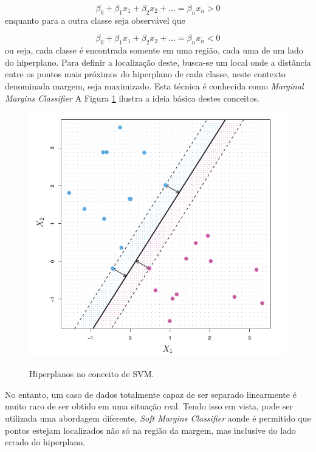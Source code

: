 \begin{equation}
\label{e.hyperplane-div1}
\beta_{0} + \beta_{1}x_{1} + \beta_{2}x_{2} + ... = \beta_{n}x_{n} > 0
\end{equation} enquanto para a outra classe seja observável que

\begin{equation}
\label{e.hyperplane-div2}
\beta_{0} + \beta_{1}x_{1} + \beta_{2}x_{2} + ... = \beta_{n}x_{n} < 0
\end{equation} ou seja, cada classe é encontrada somente em uma região, cada uma de um lado do hiperplano. Para definir a localização deste, busca-se um local onde a distância entre os pontos mais próximos do hiperplano de cada classe, neste contexto denominada margem, seja maximizado. Esta técnica é conhecida como \textit{Marginal Margins Classifier}
\cite{James:2014:ISL:2517747} A Figura \ref{f.hiperplano-svm} ilustra a ideia básica destes conceitos.

\begin{figure}[ht]
\caption{\small Hiperplanos no conceito de SVM.}
\centering
\includegraphics[scale=0.40]{figs/svm-plano.png}
\label{f.hiperplano-svm}
\end{figure}

No entanto, um caso de dados totalmente capaz de ser separado linearmente é muito raro de ser obtido em uma situação real. Tendo isso em vista, pode ser utilizada uma abordagem diferente, \textit{Soft Margins Classifier} aonde é permitido que pontos estejam localizados não só na região da margem, mas inclusive do lado errado do hiperplano. 

